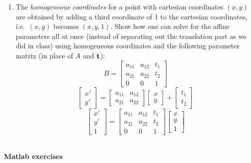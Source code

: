 \documentclass{article}
\begin{document}
\begin{enumerate}
  \item The {\em homogeneous coordinates} for a point with cartesian
  coordinates $(x,y)$ are obtained by adding a third coordinate of 1 to
  the cartesian coordinates, i.e.\ $(x,y)$ becomes $(x,y,1)$.  Show how
  one can solve for the affine parameters all at once (instead of
  separating out the translation part as we did in class) using
  homogeneous coordinates and the following parameter matrix (in place
  of $A$ and $\bf t$):
  \[
  B=\left[
  \begin{array}{ccc}
  a_{11}&a_{12}&t_1\\
  a_{21}&a_{22}&t_2\\
  0&0&1
  \end{array}
  \right]
  \]
  \linebreak\linebreak
  $$\left[\begin{array}{c}x'\\y'\end{array}\right]
    = \left[\begin{array}{cc}a_{11}&a_{12}\\a_{21}&a_{22}\end{array}\right]
    \left[\begin{array}{c}x\\y\end{array}\right]
    + \left[\begin{array}{c}t_1\\t_2\end{array}\right]$$
  $$\left[\begin{array}{c}x'\\y'\\1\end{array}\right]
    = \left[\begin{array}{ccc}a_{11}&a_{12}&t_1\\
                              a_{21}&a_{22}&t_2\\
                              0&0&1\end{array}\right]
    \left[\begin{array}{c}x\\y\\1\end{array}\right]$$\\
\end{enumerate}
{\bf Matlab exercises}
\end{document}
